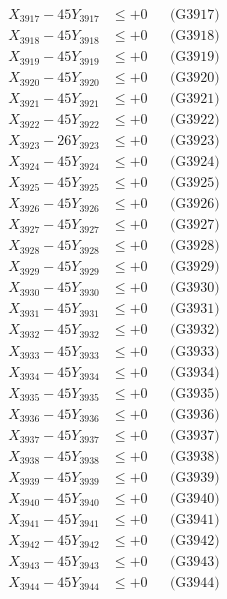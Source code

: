 \documentclass[a4paper,10pt]{article}
\begin{document}
{\begin{align}
X_{3917} - 45Y_{3917} &\leq +0 && \text{(G3917)} \\
X_{3918} - 45Y_{3918} &\leq +0 && \text{(G3918)} \\
X_{3919} - 45Y_{3919} &\leq +0 && \text{(G3919)} \\
X_{3920} - 45Y_{3920} &\leq +0 && \text{(G3920)} \\
\allowbreak
X_{3921} - 45Y_{3921} &\leq +0 && \text{(G3921)} \\
X_{3922} - 45Y_{3922} &\leq +0 && \text{(G3922)} \\
X_{3923} - 26Y_{3923} &\leq +0 && \text{(G3923)} \\
X_{3924} - 45Y_{3924} &\leq +0 && \text{(G3924)} \\
X_{3925} - 45Y_{3925} &\leq +0 && \text{(G3925)} \\
X_{3926} - 45Y_{3926} &\leq +0 && \text{(G3926)} \\
X_{3927} - 45Y_{3927} &\leq +0 && \text{(G3927)} \\
X_{3928} - 45Y_{3928} &\leq +0 && \text{(G3928)} \\
X_{3929} - 45Y_{3929} &\leq +0 && \text{(G3929)} \\
X_{3930} - 45Y_{3930} &\leq +0 && \text{(G3930)} \\
\allowbreak
X_{3931} - 45Y_{3931} &\leq +0 && \text{(G3931)} \\
X_{3932} - 45Y_{3932} &\leq +0 && \text{(G3932)} \\
X_{3933} - 45Y_{3933} &\leq +0 && \text{(G3933)} \\
X_{3934} - 45Y_{3934} &\leq +0 && \text{(G3934)} \\
X_{3935} - 45Y_{3935} &\leq +0 && \text{(G3935)} \\
X_{3936} - 45Y_{3936} &\leq +0 && \text{(G3936)} \\
X_{3937} - 45Y_{3937} &\leq +0 && \text{(G3937)} \\
X_{3938} - 45Y_{3938} &\leq +0 && \text{(G3938)} \\
X_{3939} - 45Y_{3939} &\leq +0 && \text{(G3939)} \\
X_{3940} - 45Y_{3940} &\leq +0 && \text{(G3940)} \\
\allowbreak
X_{3941} - 45Y_{3941} &\leq +0 && \text{(G3941)} \\
X_{3942} - 45Y_{3942} &\leq +0 && \text{(G3942)} \\
X_{3943} - 45Y_{3943} &\leq +0 && \text{(G3943)} \\
X_{3944} - 45Y_{3944} &\leq +0 && \text{(G3944)} \\

\end{align}}
\end{document}
